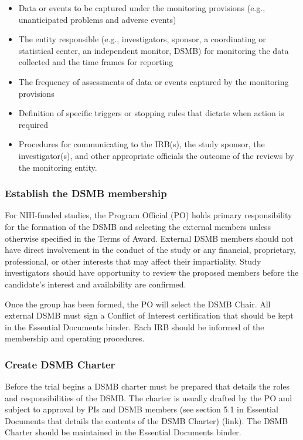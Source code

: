 \documentclass[]{book}
\providecommand{\tightlist}{%
  \setlength{\itemsep}{0pt}\setlength{\parskip}{0pt}}
\begin{document}
\begin{itemize}
\tightlist
\item
  Data or events to be captured under the monitoring provisions (e.g.,
  unanticipated problems and adverse events)
\item
  The entity responsible (e.g., investigators, sponsor, a coordinating
  or statistical center, an independent monitor, DSMB) for monitoring
  the data collected and the time frames for reporting
\item
  The frequency of assessments of data or events captured by the
  monitoring provisions
\item
  Definition of specific triggers or stopping rules that dictate when
  action is required
\item
  Procedures for communicating to the IRB(s), the study sponsor, the
  investigator(s), and other appropriate officials the outcome of the
  reviews by the monitoring entity.
\end{itemize}

\subsubsection{Establish the DSMB
membership}\label{establish-the-dsmb-membership}

For NIH-funded studies, the Program Official (PO) holds primary
responsibility for the formation of the DSMB and selecting the external
members unless otherwise specified in the Terms of Award. External DSMB
members should not have direct involvement in the conduct of the study
or any financial, proprietary, professional, or other interests that may
affect their impartiality. Study investigators should have opportunity
to review the proposed members before the candidate's interest and
availability are confirmed.

Once the group has been formed, the PO will select the DSMB Chair. All
external DSMB must sign a Conflict of Interest certification that should
be kept in the Essential Documents binder. Each IRB should be informed
of the membership and operating procedures.

\subsubsection{Create DSMB Charter}\label{create-dsmb-charter}

Before the trial begins a DSMB charter must be prepared that details the
roles and responsibilities of the DSMB. The charter is usually drafted
by the PO and subject to approval by PIs and DSMB members (see section
5.1 in Essential Documents that details the contents of the DSMB
Charter) (link). The DSMB Charter should be maintained in the Essential
Documents binder.
\end{document}
